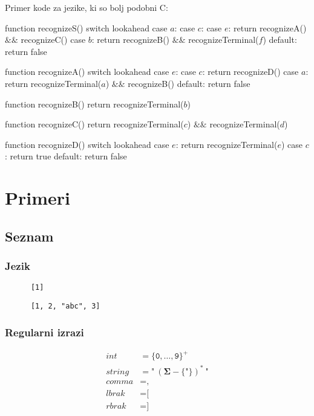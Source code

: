 \documentclass{report}
\newcommand{\Char}[1]{\texttt{#1}}
\newcommand{\Spc}{\ }
\newcommand{\Kleene}[1]{{#1}^\ast}
\newcommand{\KleenePlus}[1]{#1^+}
\newcommand{\Set}[1]{\symbf{#1}}
\newcommand{\Alphabet}{\Set{\Sigma}}
\newcommand{\T}[1]{{#1}}
\begin{document}
      \newpage
      Primer kode za jezike, ki so bolj podobni C:
      \begin{algorithm}
        function recognizeS()
          switch lookahead
            case $\T{a}$:
            case $\T{c}$:
            case $\T{e}$:
              return recognizeA() $\&\&$ recognizeC()
            case $\T{b}$:
              return recognizeB() $\&\&$ recognizeTerminal($\T{f}$)
            default:
              return false

        function recognizeA()
           switch lookahead
            case $\T{e}$:
            case $\T{c}$:
              return recognizeD()
            case $\T{a}$:
              return recognizeTerminal($\T{a}$) $\&\&$ recognizeB()
            default:
              return false

        function recognizeB()
          return recognizeTerminal($\T{b}$)

        function recognizeC()
          return recognizeTerminal($\T{c}$) $\&\&$ recognizeTerminal($\T{d}$)

        function recognizeD()
          switch lookahead
            case $\T{e}$:
              return recognizeTerminal($\T{e}$)
            case $\T{c}$:
              return true
            default:
              return false
      \end{algorithm}


    \section*{Primeri}

    \subsection{Seznam}

    \subsubsection*{Jezik}
    \begin{verbatim}
      [1]
    \end{verbatim}
    \begin{verbatim}
      [1, 2, "abc", 3]
    \end{verbatim}

    \subsubsection*{Regularni izrazi}
    \begin{equation*}
      \begin{aligned}
        \T{int} &= \KleenePlus{\{\Char{0}, \dots, \Char{9}\}}\\
        \T{string} &= \Char{"} \Spc \Kleene{(\Alphabet - \{\Char{"}\})} \Spc \Char{"}\\
        \T{comma} &= \Char{,}\\
        \T{lbrak} &= \Char{[}\\
        \T{rbrak} &= \Char{]}\\
      \end{aligned}
    \end{equation*}
\end{document}
